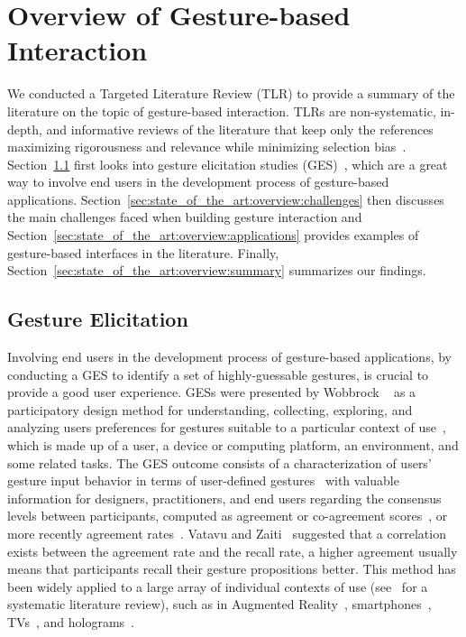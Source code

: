 \newpage

\section{Overview of Gesture-based Interaction} \label{sec:state_of_the_art:overview}
We conducted a Targeted Literature Review (TLR) to provide a summary of the literature on the topic of gesture-based interaction. TLRs are non-systematic, in-depth, and informative reviews of the literature that keep only the references maximizing rigorousness and relevance while minimizing selection bias~\cite{Kysh:2013}.
%
Section~\ref{sec:state_of_the_art:overview:ges} first looks into gesture elicitation studies (GES)~\cite{Wobbrock:2009}, which are a great way to involve end users in the development process of gesture-based applications. 
Section~\ref{sec:state_of_the_art:overview:challenges} then discusses the main challenges faced when building gesture interaction and Section~\ref{sec:state_of_the_art:overview:applications} provides examples of gesture-based interfaces in the literature.
Finally, Section~\ref{sec:state_of_the_art:overview:summary} summarizes our findings.

\subsection{Gesture Elicitation} \label{sec:state_of_the_art:overview:ges}
Involving end users in the development process of gesture-based applications, \eg by conducting a GES to identify a set of highly-guessable gestures, is crucial to provide a good user experience.
GESs were presented by Wobbrock \etal~\cite{Wobbrock:2009} as a participatory design method for understanding, collecting, exploring, and analyzing users preferences for gestures suitable to a particular context of use~\cite{Calvary:2003}, which is made up of a user, a device or computing platform, an environment, and some related tasks. The GES outcome consists of a characterization of users' gesture input behavior in terms of user-defined gestures~\cite{Grijincu:2014} with valuable information for designers, practitioners, and end users regarding the consensus levels between participants, computed as agreement or co-agreement scores~\cite{Vatavu:2014b}, or more recently agreement rates~\cite{Vatavu:2015}.
Vatavu and Zaiti~\cite{Vatavu:2014b} suggested that a correlation exists between the agreement rate and the recall rate, \ie a higher agreement usually means that participants recall their gesture propositions better.
This method has been widely applied to a large array of individual contexts of use (see~\cite{Villarreal:2020} for a systematic literature review), such as in Augmented Reality~\cite{Piumsomboon:2013}, smartphones~\cite{Ruiz:2011}, TVs~\cite{Vatavu:2014b,Morris:2012,Dong:2015}, and holograms~\cite{Pham:2018}.


